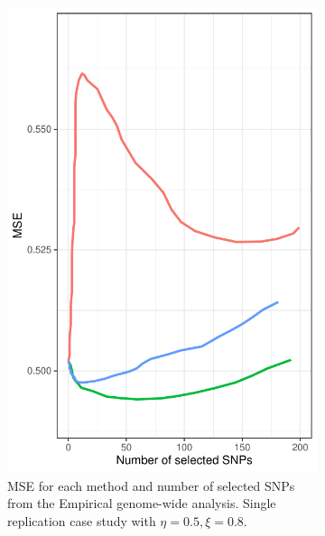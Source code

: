 \begin{figure}[H]
\begin{subfigure}[b]{0.4\textwidth}
         \includegraphics[width=\textwidth]{figures/figure_05b.pdf}
         \caption{MSE for each method and number of selected SNPs from the Empirical genome-wide analysis. Single replication case study with $\eta = 0.5, \xi = 0.8$.}
        \label{fig:gw_mse}
     \end{subfigure}
     \begin{subfigure}[b]{0.1\textwidth}
         \centering

\end{subfigure}
\end{figure}
